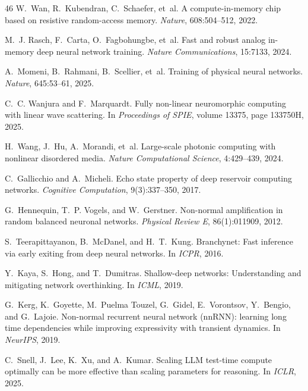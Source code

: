 \documentclass{article}
\theoremstyle{remark}
\begin{document}
\begin{thebibliography}{46}
W.~Wan, R.~Kubendran, C.~Schaefer, et~al.
\newblock A compute-in-memory chip based on resistive random-access memory.
\newblock \emph{Nature}, 608:504--512, 2022.

M.~J. Rasch, F.~Carta, O.~Fagbohungbe, et~al.
\newblock Fast and robust analog in-memory deep neural network training.
\newblock \emph{Nature Communications}, 15:7133, 2024.

A.~Momeni, B.~Rahmani, B.~Scellier, et~al.
\newblock Training of physical neural networks.
\newblock \emph{Nature}, 645:53--61, 2025.

C.~C. Wanjura and F.~Marquardt.
\newblock Fully non-linear neuromorphic computing with linear wave scattering.
\newblock In \emph{Proceedings of SPIE}, volume 13375, page 133750H, 2025.

H.~Wang, J.~Hu, A.~Morandi, et~al.
\newblock Large-scale photonic computing with nonlinear disordered media.
\newblock \emph{Nature Computational Science}, 4:429--439, 2024.

C.~Gallicchio and A.~Micheli.
\newblock Echo state property of deep reservoir computing networks.
\newblock \emph{Cognitive Computation}, 9(3):337--350, 2017.

G.~Hennequin, T.~P. Vogels, and W.~Gerstner.
\newblock Non-normal amplification in random balanced neuronal networks.
\newblock \emph{Physical Review E}, 86(1):011909, 2012.


S.~Teerapittayanon, B.~McDanel, and H.~T.~Kung.
\newblock Branchynet: Fast inference via early exiting from deep neural
  networks.
\newblock In \emph{ICPR}, 2016.

Y.~Kaya, S.~Hong, and T.~Dumitras.
\newblock Shallow-deep networks: Understanding and mitigating network
  overthinking.
\newblock In \emph{ICML}, 2019.

G.~Kerg, K.~Goyette, M.~Puelma Touzel, G.~Gidel, E.~Vorontsov, Y.~Bengio, and
  G.~Lajoie.
\newblock Non-normal recurrent neural network (nnRNN): learning long time
  dependencies while improving expressivity with transient dynamics.
\newblock In \emph{NeurIPS}, 2019.

C.~Snell, J.~Lee, K.~Xu, and A.~Kumar.
\newblock Scaling {LLM} test-time compute optimally can be more effective than
  scaling parameters for reasoning.
\newblock In \emph{ICLR}, 2025.


\end{thebibliography}
\end{document}
